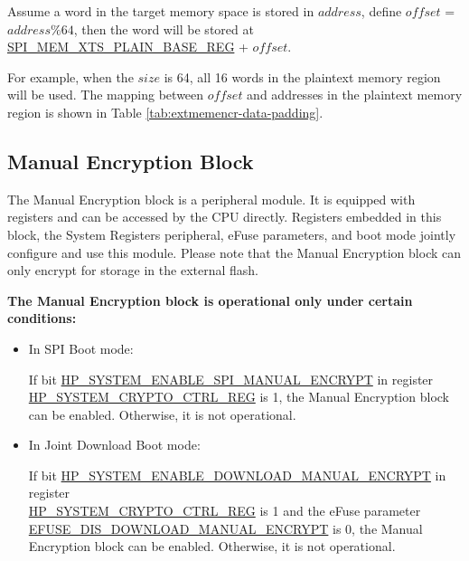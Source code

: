 \documentclass[main\_\_EN.tex]{subfiles}
\begin{document}
Assume a word in the target memory space is stored in \begin{math} address \end{math}, define \begin{math}offset\end{math} = \begin{math} address \% 64 \end{math}, then the word will be stored at \hyperref[regdesc:SPIMEMXTSPLAINBASEREG]{SPI\_MEM\_XTS\_PLAIN\_BASE\_REG} + \begin{math}offset\end{math}.

For example, when the \begin{math} size \end{math} is 64, all 16 words in the plaintext memory region will be used. The mapping between \begin{math}offset\end{math} and addresses in the plaintext memory region is shown in Table \ref{tab:extmemencr-data-padding}.



\subsection{Manual Encryption Block}

The Manual Encryption block is a peripheral module. It is equipped with registers and can be accessed by the CPU directly. Registers embedded in this block, the System Registers peripheral, eFuse parameters, and boot mode jointly configure and use this module. Please note that the Manual Encryption block can only encrypt for storage in the external flash.

\textbf{The Manual Encryption block is operational only under certain conditions:}

\begin{itemize}

    \item In SPI Boot mode:

    If bit \hyperref[fielddesc:HPSYSTEMENABLESPIMANUALENCRYPT]{HP\_SYSTEM\_ENABLE\_SPI\_MANUAL\_ENCRYPT} in register\\ \hyperref[regdesc:HPSYSTEMCRYPTOCTRLREG]{HP\_SYSTEM\_CRYPTO\_CTRL\_REG} is 1, the Manual Encryption block can be enabled. Otherwise, it is not operational.

    \item In Joint Download Boot mode:

    If bit \hyperref[fielddesc:HPSYSTEMENABLEDOWNLOADMANUALENCRYPT]{HP\_SYSTEM\_ENABLE\_DOWNLOAD\_MANUAL\_ENCRYPT} in register\\ \hyperref[regdesc:HPSYSTEMCRYPTOCTRLREG]{HP\_SYSTEM\_CRYPTO\_CTRL\_REG} is 1 and the eFuse parameter\\ \hyperref[fielddesc:EFUSEDISDOWNLOADMANUALENCRYPT]{EFUSE\_DIS\_DOWNLOAD\_MANUAL\_ENCRYPT} is 0, the Manual Encryption block can be enabled. Otherwise, it is not operational.

\end{itemize}
\end{document}
